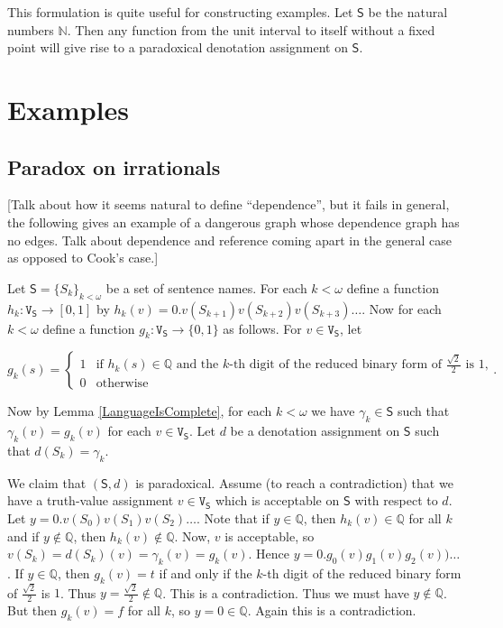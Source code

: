 \documentclass[12pt]{article}
\theoremstyle{remark}
\def\S{\textsf{S}}
\def\V{\texttt{V}}
\begin{document}
This formulation is quite useful for constructing examples.  Let $\S$ be the natural numbers $\mathbb{N}$.  Then any function from the unit interval to itself without a fixed point will give rise to a paradoxical denotation assignment on $\S$.\newline

\section{Examples}

\subsection{Paradox on irrationals}
[Talk about how it seems natural to define ``dependence'', but it fails in general, the following gives an example of a dangerous graph whose dependence graph has no edges.  Talk about dependence and reference coming apart in the general case as opposed to Cook's case.]\newline

Let $\S = \{S_k\}_{k < \omega}$ be a set of sentence names.   For each $k < \omega$ define a function $h_k:\V_\S \rightarrow [0,1]$ by $h_k(v) = 0.v(S_{k+1})v(S_{k+2})v(S_{k+3})\ldots$.  Now for each $k < \omega$ define a function $g_k:\V_\S \rightarrow \{0, 1\}$ as follows. For $v \in \V_\S$, let 

\[g_k(s) = \begin{cases}
1 & \text{if } h_k(s) \in \mathbb{Q} \text{ and the $k$-th digit of the reduced binary form of $\frac{\sqrt{2}}{2}$ is $1$,}\\
0 & \text{otherwise}
\end{cases}.\]

Now by Lemma \ref{LanguageIsComplete}, for each $k < \omega$ we have $\gamma_k \in \S$ such that $\gamma_k(v) = g_k(v)$ for each $v \in \V_\S$.  Let $d$ be a denotation assignment on $\S$ such that $d(S_k) = \gamma_k$.\newline

We claim that $(\S, d)$ is paradoxical.  Assume (to reach a contradiction) that we have a truth-value assignment $v \in \V_\S$ which is acceptable on $\S$ with respect to $d$. Let $y = 0.v(S_{0})v(S_{1})v(S_{2})\ldots$. Note that if $y \in \mathbb{Q}$, then $h_k(v) \in \mathbb{Q}$ for all $k$ and if $y \not \in \mathbb{Q}$, then $h_k(v) \not \in \mathbb{Q}$.  Now, $v$ is acceptable, so $v(S_k) = d(S_k)(v) = \gamma_k(v) = g_k(v)$.  Hence $y = 0.g_0(v)g_1(v)g_2(v))\ldots$.  If $y \in \mathbb{Q}$, then $g_k(v) = t$ if and only if the $k$-th digit of the reduced binary form of $\frac{\sqrt{2}}{2}$ is $1$.  Thus $y = \frac{\sqrt{2}}{2} \not \in \mathbb{Q}$.  This is a contradiction.  Thus we must have $y \not \in \mathbb{Q}$.  But then $g_k(v) = f$ for all $k$, so $y = 0 \in \mathbb{Q}$.  Again this is a contradiction.
\end{document}
